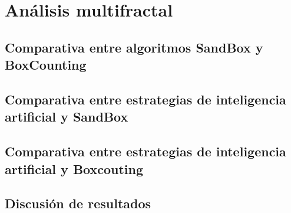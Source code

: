 \section{Análisis multifractal}

\subsection{Comparativa entre algoritmos SandBox y BoxCounting}

\subsection{Comparativa entre estrategias de inteligencia artificial y SandBox}

\subsection{Comparativa entre estrategias de inteligencia artificial y Boxcouting}

\subsection{Discusión de resultados}
